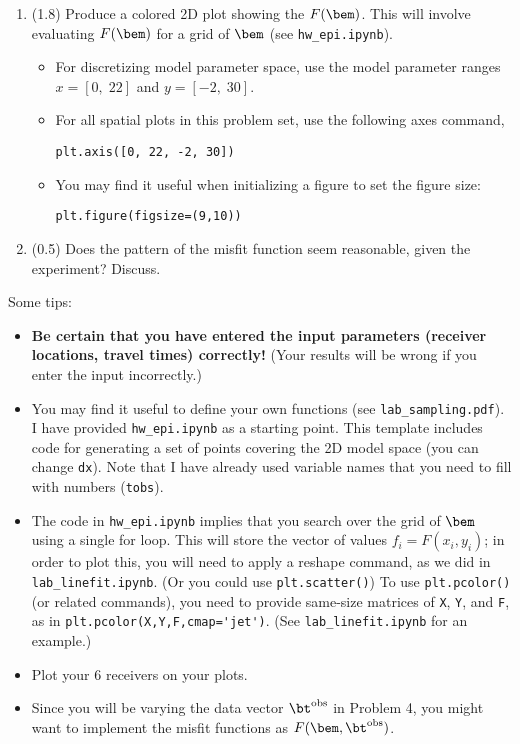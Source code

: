 \documentclass[11pt,titlepage,fleqn]{article}
\begin{document}
\begin{enumerate}
\begin{enumerate}
\item (1.8) Produce a colored 2D plot showing the $F(\bem)$. This will involve evaluating $F(\bem)$ for a grid of $\bem$ (see \verb+hw_epi.ipynb+).

\begin{itemize}
\item For discretizing model parameter space, use the model parameter ranges $x = [0,\;22]$ and $y = [-2,\;30]$.
\item For all spatial plots in this problem set, use the following axes command,

\verb+plt.axis([0, 22, -2, 30])+

\item You may find it useful when initializing a figure to set the figure size:

\verb+plt.figure(figsize=(9,10))+
\end{itemize}

\item (0.5) Does the pattern of the misfit function seem reasonable, given the experiment? Discuss.
\end{enumerate}

Some tips:
%
\begin{itemize}
\item {\bf Be certain that you have entered the input parameters (\eg receiver locations, travel times) correctly!} (Your results will be wrong if you enter the input incorrectly.)

\item You may find it useful to define your own functions (see \verb+lab_sampling.pdf+). I have provided \verb+hw_epi.ipynb+ as a starting point. This template includes code for generating a set of points covering the 2D model space (you can change \verb+dx+). Note that I have already used variable names that you need to fill with numbers (\eg \verb+tobs+).

\item The code in \verb+hw_epi.ipynb+ implies that you search over the grid of $\bem$ using a single for loop. This will store the vector of values $f_i = F(x_i,y_i)$; in order to plot this, you will need to apply a reshape command, as we did in \verb+lab_linefit.ipynb+. (Or you could use \verb+plt.scatter()+) To use \verb+plt.pcolor()+ (or related commands), you need to provide same-size matrices of \verb+X+, \verb+Y+, and \verb+F+, as in \verb+plt.pcolor(X,Y,F,cmap='jet')+. (See \verb+lab_linefit.ipynb+ for an example.)

\item Plot your 6 receivers on your plots. 

\item Since you will be varying the data vector $\bt^{\rm obs}$ in Problem 4, you might want to implement the misfit functions as $F(\bem,\bt^{\rm obs})$.

\end{itemize}

\end{enumerate}
\end{document}
